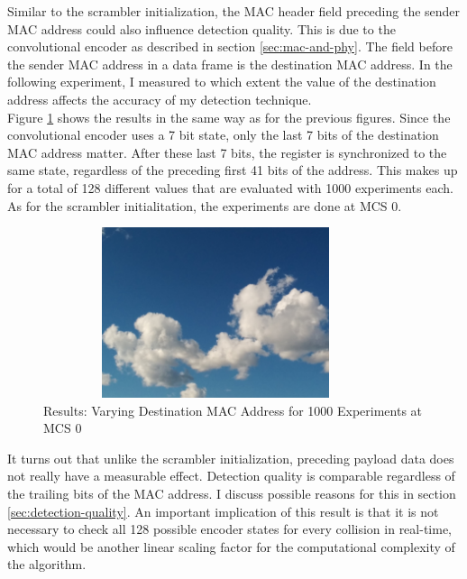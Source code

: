 Similar to the scrambler initialization, the MAC header field preceding the sender MAC address could also influence detection quality. This is due to the convolutional encoder as described in section \ref{sec:mac-and-phy}. The field before the sender MAC address in a data frame is the destination MAC address. In the following experiment, I measured to which extent the value of the destination address affects the accuracy of my detection technique.\\

Figure \ref{fig:vary_dest} shows the results in the same way as for the previous figures. Since the convolutional encoder uses a 7 bit state, only the last 7 bits of the destination MAC address matter. After these last 7 bits, the register is synchronized to the same state, regardless of the preceding first 41 bits of the address. This makes up for a total of 128 different values that are evaluated with 1000 experiments each. As for the scrambler initialitation, the experiments are done at \gls{MCS} 0.

\begin{figure}[H]
	\centering
	\includegraphics[width=0.9\textwidth,height=5cm]{gfx/images/stock-clouds}
	\caption[Results: Varying Destination MAC Address for 1000 Experiments]{Results: Varying Destination MAC Address for 1000 Experiments at MCS 0}
	\label{fig:vary_dest}
\end{figure}

It turns out that unlike the scrambler initialization, preceding payload data does not really have a measurable effect. Detection quality is comparable regardless of the trailing bits of the MAC address. I discuss possible reasons for this in section \ref{sec:detection-quality}. An important implication of this result is that it is not necessary to check all 128 possible encoder states for every collision in real-time, which would be another linear scaling factor for the computational complexity of the algorithm.


